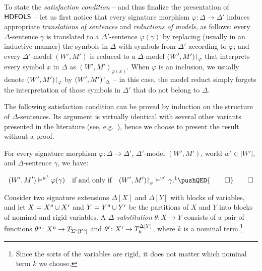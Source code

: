 \documentclass[a4paper,UKenglish,cleveref,autoref]{lipics-v2019}
\begin{document}
To state the \emph{satisfaction condition} -- and thus finalize the presentation of \({\mathsf{HDFOLS}}\) -- let us first notice that every signature morphism \(\varphi \colon \Delta \to \Delta'\) induces appropriate \emph{translations of sentences} and \emph{reductions of models}, as follows:
every \(\Delta\)-sentence \(\gamma\) is translated to a \(\Delta'\)-sentence \(\varphi(\gamma)\) by replacing (usually in an inductive manner) the symbols in \(\Delta\) with symbols from \(\Delta'\) according to \(\varphi\);
and every \(\Delta'\)-model \((W', M')\) is reduced to a \(\Delta\)-model \((W', M') \mathord{\upharpoonright}_{\varphi}\) that interprets every symbol \(x\) in \(\Delta\) as \((W', M')_{\varphi(x)}\).
When \(\varphi\) is an inclusion, we usually denote \((W', M') \mathord{\upharpoonright}_{\varphi}\) by \((W', M') \mathord{\upharpoonright}_{\Delta}\) -- in this case, the model reduct simply forgets the interpretation of those symbols in \(\Delta'\) that do not belong to \(\Delta\).

The following satisfaction condition can be proved by induction on the structure of \(\Delta\)-sentences.
Its argument is virtually identical with several other variants presented in the literature (see, e.g.~\cite{Diaconescu16}), hence we choose to present the result without a proof.

\begin{proposition}
  \label{proposition:morph-sat-cond}
  For every signature morphism \(\varphi \colon \Delta \to \Delta'\), \(\Delta'\)-model \((W', M')\), world \(w' \in |W'|\), and \(\Delta\)-sentence \(\gamma\), we have:
  \addtocounter{footnote}{-1}
  \[
    (W', M') \models^{w'} \varphi(\gamma)
    \quad\text{if and only if}\quad
    (W', M') \red_{\varphi} \models^{w'} \gamma.\footnotemark
    \pushQED{\qed}
    \qedhere
  \]
\end{proposition}

Consider two signature extensions \(\Delta[X]\) and \(\Delta[Y]\) with blocks of variables, and let \(X = X^{\text{\normalfont\sffamily\itshape n}} \cup X^{\text{\normalfont\sffamily\itshape r}}\) and \(Y = Y^{\text{\normalfont\sffamily\itshape n}} \cup Y^{\text{\normalfont\sffamily\itshape r}}\) be the partitions of \(X\) and \(Y\) into blocks of nominal and rigid variables.
A \emph{\(\Delta\)-substitution} \(\theta \colon X \to Y\) consists of a pair of functions
\(\theta^{\text{\normalfont\sffamily\itshape n}} \colon X^{\text{\normalfont\sffamily\itshape n}} \to T_{\Sigma^{\text{\normalfont\sffamily\itshape n}}[Y^{\text{\normalfont\sffamily\itshape n}}]}\) and
\(\theta^{\text{\normalfont\sffamily\itshape r}} \colon X^{\text{\normalfont\sffamily\itshape r}} \to T^{\Delta[Y]}_{k}\), where \(k\) is a nominal term.\footnote{Since the sorts of the variables are rigid, it does not matter which nominal term \(k\) we choose.}
\end{document}
